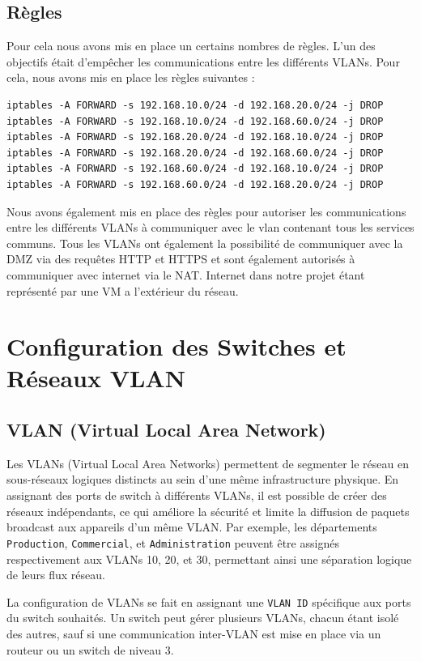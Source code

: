 \documentclass[a4paper,12pt,openany]{report}
\begin{document}
            \subsection{Règles}
            Pour cela nous avons mis en place un certains nombres de règles. L'un des objectifs était d'empêcher les communications entre les différents VLANs. Pour cela, nous avons mis en place les règles suivantes :
            \begin{verbatim}
iptables -A FORWARD -s 192.168.10.0/24 -d 192.168.20.0/24 -j DROP
iptables -A FORWARD -s 192.168.10.0/24 -d 192.168.60.0/24 -j DROP
iptables -A FORWARD -s 192.168.20.0/24 -d 192.168.10.0/24 -j DROP
iptables -A FORWARD -s 192.168.20.0/24 -d 192.168.60.0/24 -j DROP
iptables -A FORWARD -s 192.168.60.0/24 -d 192.168.10.0/24 -j DROP
iptables -A FORWARD -s 192.168.60.0/24 -d 192.168.20.0/24 -j DROP
            \end{verbatim}
            Nous avons également mis en place des règles pour autoriser les communications entre les différents VLANs à communiquer avec le vlan contenant tous les services communs. Tous les VLANs ont également la possibilité de communiquer avec la DMZ via des requêtes HTTP et HTTPS et sont également autorisés à communiquer avec internet via le NAT. Internet dans notre projet étant représenté par une VM a l'extérieur du réseau. 

        \section{Configuration des Switches et Réseaux VLAN}

            \subsection{VLAN (Virtual Local Area Network)}
                Les VLANs (Virtual Local Area Networks) permettent de segmenter le réseau en sous-réseaux logiques distincts au sein d'une même infrastructure physique. En assignant des ports de switch à différents VLANs, il est possible de créer des réseaux indépendants, ce qui améliore la sécurité et limite la diffusion de paquets broadcast aux appareils d'un même VLAN. Par exemple, les départements \texttt{Production}, \texttt{Commercial}, et \texttt{Administration} peuvent être assignés respectivement aux VLANs 10, 20, et 30, permettant ainsi une séparation logique de leurs flux réseau.

                La configuration de VLANs se fait en assignant une \texttt{VLAN ID} spécifique aux ports du switch souhaités. Un switch peut gérer plusieurs VLANs, chacun étant isolé des autres, sauf si une communication inter-VLAN est mise en place via un routeur ou un switch de niveau 3.
\end{document}
